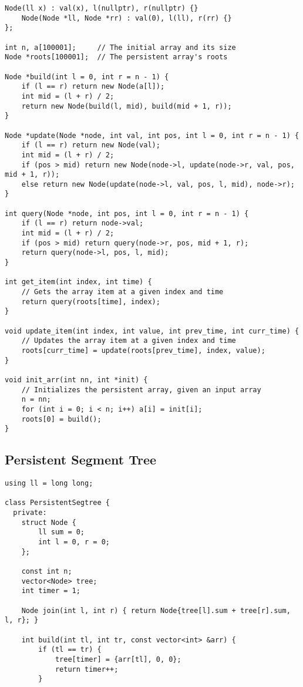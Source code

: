 \documentclass[10pt]{article}
\begin{document}
\begin{multicols*}{2}
\begin{lstlisting}[style=compactcpp]
	Node(ll x) : val(x), l(nullptr), r(nullptr) {}
	Node(Node *ll, Node *rr) : val(0), l(ll), r(rr) {}
};

int n, a[100001];     // The initial array and its size
Node *roots[100001];  // The persistent array's roots

Node *build(int l = 0, int r = n - 1) {
	if (l == r) return new Node(a[l]);
	int mid = (l + r) / 2;
	return new Node(build(l, mid), build(mid + 1, r));
}

Node *update(Node *node, int val, int pos, int l = 0, int r = n - 1) {
	if (l == r) return new Node(val);
	int mid = (l + r) / 2;
	if (pos > mid) return new Node(node->l, update(node->r, val, pos, mid + 1, r));
	else return new Node(update(node->l, val, pos, l, mid), node->r);
}

int query(Node *node, int pos, int l = 0, int r = n - 1) {
	if (l == r) return node->val;
	int mid = (l + r) / 2;
	if (pos > mid) return query(node->r, pos, mid + 1, r);
	return query(node->l, pos, l, mid);
}

int get_item(int index, int time) {
	// Gets the array item at a given index and time
	return query(roots[time], index);
}

void update_item(int index, int value, int prev_time, int curr_time) {
	// Updates the array item at a given index and time
	roots[curr_time] = update(roots[prev_time], index, value);
}

void init_arr(int nn, int *init) {
	// Initializes the persistent array, given an input array
	n = nn;
	for (int i = 0; i < n; i++) a[i] = init[i];
	roots[0] = build();
}
\end{lstlisting}

\subsection{Persistent Segment Tree}

\begin{lstlisting}[style=compactcpp]
using ll = long long;

class PersistentSegtree {
  private:
	struct Node {
		ll sum = 0;
		int l = 0, r = 0;
	};

	const int n;
	vector<Node> tree;
	int timer = 1;

	Node join(int l, int r) { return Node{tree[l].sum + tree[r].sum, l, r}; }

	int build(int tl, int tr, const vector<int> &arr) {
		if (tl == tr) {
			tree[timer] = {arr[tl], 0, 0};
			return timer++;
		}


\end{lstlisting}
\end{multicols*}
\end{document}
